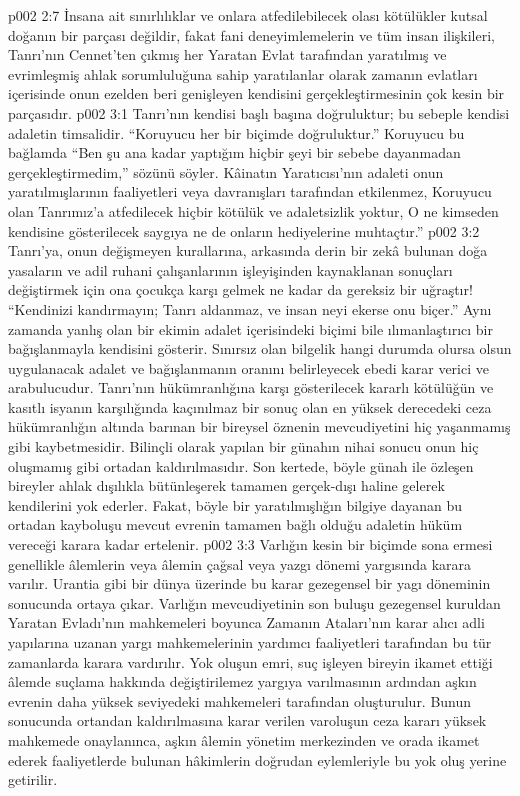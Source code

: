 \vs p002 2:7 İnsana ait sınırlılıklar ve onlara atfedilebilecek olası kötülükler kutsal doğanın bir parçası değildir, fakat fani deneyimlemelerin  ve tüm insan ilişkileri, Tanrı’nın Cennet’ten çıkmış her Yaratan Evlat tarafından yaratılmış ve evrimleşmiş ahlak sorumluluğuna sahip yaratılanlar olarak zamanın evlatları içerisinde onun ezelden beri genişleyen kendisini gerçekleştirmesinin çok kesin bir parçasıdır.
\vs p002 3:1 Tanrı’nın kendisi başlı başına doğruluktur; bu sebeple kendisi adaletin timsalidir. “Koruyucu her bir biçimde doğruluktur.” Koruyucu bu bağlamda “Ben şu ana kadar yaptığım hiçbir şeyi bir sebebe dayanmadan gerçekleştirmedim,” sözünü söyler. Kâinatın Yaratıcısı’nın adaleti onun yaratılmışlarının faaliyetleri veya davranışları tarafından etkilenmez, Koruyucu olan Tanrımız’a atfedilecek hiçbir kötülük ve adaletsizlik yoktur, O ne kimseden kendisine gösterilecek saygıya ne de onların hediyelerine muhtaçtır.”
\vs p002 3:2 Tanrı’ya, onun değişmeyen kurallarına, arkasında derin bir zekâ bulunan doğa yasaların ve adil ruhani çalışanlarının işleyişinden kaynaklanan sonuçları değiştirmek için ona çocukça karşı gelmek ne kadar da gereksiz bir uğraştır! “Kendinizi kandırmayın; Tanrı aldanmaz, ve insan neyi ekerse onu biçer.” Aynı zamanda yanlış olan bir ekimin adalet içerisindeki biçimi bile ılımanlaştırıcı bir bağışlanmayla kendisini gösterir. Sınırsız olan bilgelik hangi durumda olursa olsun uygulanacak adalet ve bağışlanmanın oranını belirleyecek ebedi karar verici ve arabulucudur. Tanrı’nın hükümranlığına karşı gösterilecek kararlı kötülüğün ve kasıtlı isyanın karşılığında kaçınılmaz bir sonuç olan en yüksek derecedeki ceza hükümranlığın altında barınan bir bireysel öznenin mevcudiyetini hiç yaşanmamış gibi kaybetmesidir. Bilinçli olarak yapılan bir günahın nihai sonucu onun hiç oluşmamış gibi ortadan kaldırılmasıdır. Son kertede, böyle günah ile özleşen bireyler ahlak dışılıkla bütünleşerek tamamen gerçek\hyp{}dışı haline gelerek kendilerini yok ederler. Fakat, böyle bir yaratılmışlığın bilgiye dayanan bu ortadan kayboluşu mevcut evrenin tamamen bağlı olduğu adaletin hüküm vereceği karara kadar ertelenir.
\vs p002 3:3 Varlığın kesin bir biçimde sona ermesi genellikle âlemlerin veya âlemin çağsal veya yazgı dönemi yargısında karara varılır. Urantia gibi bir dünya üzerinde bu karar gezegensel bir yagı döneminin sonucunda ortaya çıkar. Varlığın mevcudiyetinin son buluşu gezegensel kuruldan Yaratan Evladı’nın mahkemeleri boyunca Zamanın Ataları’nın karar alıcı adli yapılarına uzanan yargı mahkemelerinin yardımcı faaliyetleri tarafından bu tür zamanlarda karara vardırılır. Yok oluşun emri, suç işleyen bireyin ikamet ettiği âlemde suçlama hakkında değiştirilemez yargıya varılmasının ardından aşkın evrenin daha yüksek seviyedeki mahkemeleri tarafından oluşturulur. Bunun sonucunda ortandan kaldırılmasına karar verilen varoluşun ceza kararı yüksek mahkemede onaylanınca, aşkın âlemin yönetim merkezinden ve orada ikamet ederek faaliyetlerde bulunan hâkimlerin doğrudan eylemleriyle bu yok oluş yerine getirilir.
